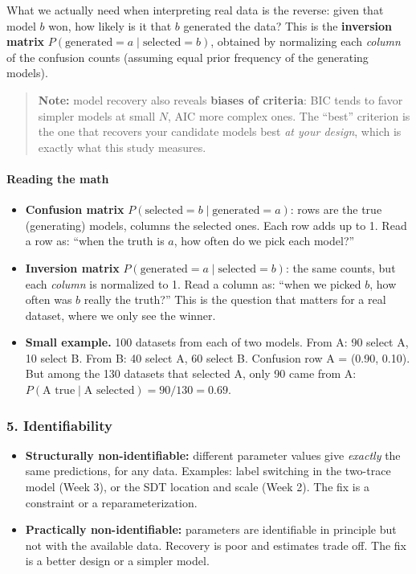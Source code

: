 What we actually need when interpreting real data is the reverse: given
that model \(b\) won, how likely is it that \(b\) generated the data?
This is the \textbf{inversion matrix}
\(P(\text{generated} = a \mid \text{selected} = b)\), obtained by
normalizing each \emph{column} of the confusion counts (assuming equal
prior frequency of the generating models).

\begin{quote}
\textbf{Note:} model recovery also reveals \textbf{biases of criteria}:
BIC tends to favor simpler models at small \(N\), AIC more complex ones.
The ``best'' criterion is the one that recovers your candidate models
best \emph{at your design}, which is exactly what this study measures.
\end{quote}

\paragraph{Reading the math}

\begin{itemize}
\tightlist
\item
  \textbf{Confusion matrix}
  \(P(\text{selected} = b \mid \text{generated} = a)\): rows are the
  true (generating) models, columns the selected ones. Each row adds up
  to 1. Read a row as: ``when the truth is \(a\), how often do we pick
  each model?''
\item
  \textbf{Inversion matrix}
  \(P(\text{generated} = a \mid \text{selected} = b)\): the same counts,
  but each \emph{column} is normalized to 1. Read a column as: ``when we
  picked \(b\), how often was \(b\) really the truth?'' This is the
  question that matters for a real dataset, where we only see the
  winner.
\item
  \textbf{Small example.} 100 datasets from each of two models. From A:
  90 select A, 10 select B. From B: 40 select A, 60 select B. Confusion
  row A = (0.90, 0.10). But among the 130 datasets that selected A, only
  90 came from A:
  \(P(\text{A true} \mid \text{A selected}) = 90/130 = 0.69\).
\end{itemize}

\subsubsection{5. Identifiability}

\begin{itemize}
\tightlist
\item
  \textbf{Structurally non-identifiable:} different parameter values
  give \emph{exactly} the same predictions, for any data. Examples:
  label switching in the two-trace model (Week 3), or the SDT location
  and scale (Week 2). The fix is a constraint or a reparameterization.
\item
  \textbf{Practically non-identifiable:} parameters are identifiable in
  principle but not with the available data. Recovery is poor and
  estimates trade off. The fix is a better design or a simpler model.
\end{itemize}

